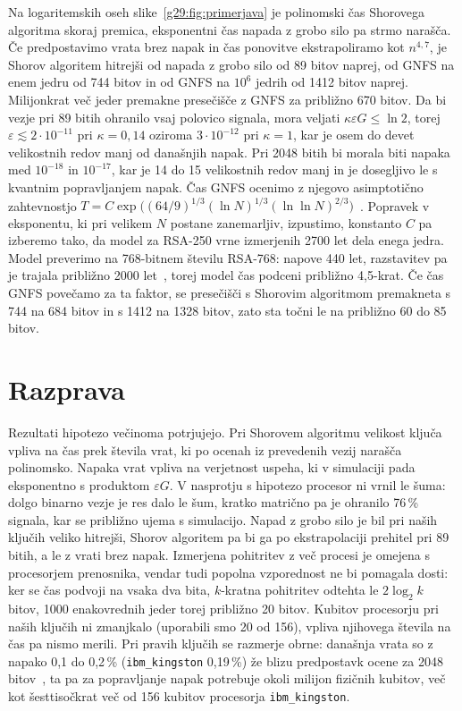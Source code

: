  Na logaritemskih oseh slike~\ref{g29:fig:primerjava} je polinomski čas Shorovega algoritma skoraj premica, eksponentni čas napada z grobo silo pa strmo narašča. Če predpostavimo vrata brez napak in čas ponovitve ekstrapoliramo kot $n^{4{,}7}$, je Shorov algoritem hitrejši od napada z grobo silo od 89 bitov naprej, od GNFS na enem jedru od 744 bitov in od GNFS na $10^6$ jedrih od 1412 bitov naprej. Milijonkrat več jeder premakne presečišče z GNFS za približno 670 bitov. Da bi vezje pri 89 bitih ohranilo vsaj polovico signala, mora veljati $\kappa \varepsilon G \le \ln 2$, torej $\varepsilon \lesssim 2 \cdot 10^{-11}$ pri $\kappa = 0{,}14$ oziroma $3 \cdot 10^{-12}$ pri $\kappa = 1$, kar je osem do devet velikostnih redov manj od današnjih napak. Pri 2048 bitih bi morala biti napaka med $10^{-18}$ in $10^{-17}$, kar je 14 do 15 velikostnih redov manj in je dosegljivo le s kvantnim popravljanjem napak. Čas GNFS ocenimo z njegovo asimptotično zahtevnostjo $T = C \exp\!\big((64/9)^{1/3} (\ln N)^{1/3} (\ln \ln N)^{2/3}\big)$~\cite{g29:lenstra1990}. Popravek v eksponentu, ki pri velikem $N$ postane zanemarljiv, izpustimo, konstanto $C$ pa izberemo tako, da model za RSA-250 vrne izmerjenih 2700 let dela enega jedra. Model preverimo na 768-bitnem številu RSA-768: napove 440 let, razstavitev pa je trajala približno 2000 let~\cite{g29:kleinjung2010}, torej model čas podceni približno 4,5-krat. Če čas GNFS povečamo za ta faktor, se presečišči s Shorovim algoritmom premakneta s 744 na 684 bitov in s 1412 na 1328 bitov, zato sta točni le na približno 60 do 85 bitov.


\section{Razprava}
\label{g29:sec:razprava}

Rezultati hipotezo večinoma potrjujejo. Pri Shorovem algoritmu velikost ključa vpliva na čas prek števila vrat, ki po ocenah iz prevedenih vezij narašča polinomsko. Napaka vrat vpliva na verjetnost uspeha, ki v simulaciji pada eksponentno s produktom $\varepsilon G$. V nasprotju s hipotezo procesor ni vrnil le šuma: dolgo binarno vezje je res dalo le šum, kratko matrično pa je ohranilo 76\,\% signala, kar se približno ujema s simulacijo. Napad z grobo silo je bil pri naših ključih veliko hitrejši, Shorov algoritem pa bi ga po ekstrapolaciji prehitel pri 89 bitih, a le z vrati brez napak. Izmerjena pohitritev z več procesi je omejena s procesorjem prenosnika, vendar tudi popolna vzporednost ne bi pomagala dosti: ker se čas podvoji na vsaka dva bita, $k$-kratna pohitritev odtehta le $2 \log_2 k$ bitov, 1000 enakovrednih jeder torej približno 20 bitov. Kubitov procesorju pri naših ključih ni zmanjkalo (uporabili smo 20 od 156), vpliva njihovega števila na čas pa nismo merili. Pri pravih ključih se razmerje obrne: današnja vrata so z napako 0,1 do 0,2\,\% (\texttt{ibm\_kingston} 0,19\,\%) že blizu predpostavk ocene za 2048 bitov~\cite{g29:gidney2025}, ta pa za popravljanje napak potrebuje okoli milijon fizičnih kubitov, več kot šesttisočkrat več od 156 kubitov procesorja \texttt{ibm\_kingston}.

